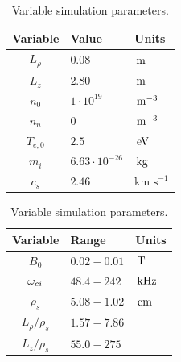 \begin{table}[h!]
    \begin{minipage}{.45\linewidth}
      \centering
            \begin{tabular}{c|ll}
            \hline\hline
            Variable & Value & Units\\
            \hline
            $L_\rho$  & $0.08$              & $\, \text{m}$              \\
            $L_z$     & $2.80$              & $\, \text{m}$              \\
            $n_0$     & $1\cdot 10^{19}$    & $\, \text{m}^{-3}$         \\
            $n_n$     & $0$                 & $\, \text{m}^{-3}$         \\
            $T_{e,0}$ & $2.5$               & $\, \text{eV}$             \\
            $m_i$     & $6.63\cdot10^{-26}$ & $\, \text{kg}$             \\
            $c_s$     & $2.46$              & $\text{km s}^{-1}$\\
            \hline\hline
            \end{tabular}
            \caption{Fixed simulation parameters.}
            \label{tb:input}
    \end{minipage}
    \hfill
    \begin{minipage}{.45\linewidth}
      \centering
            \begin{tabular}{c|ll}
            \hline\hline
            Variable & Range & Units\\
            \hline
            $B_0$           & $0.02 - 0.01$  & $\, \text{T} $ \\
            $\omega_{ci}$      & $48.4 - 242$   & $\, \text{kHz}$\\
            $\rho_s$        & $5.08 - 1.02$  & $\, \text{cm}$ \\
            $L_\rho/\rho_s$ & $1.57 - 7.86$  &       \\
            $L_z/\rho_s$    & $55.0 - 275$   &       \\
            \hline\hline
            \end{tabular}
            \caption{Variable simulation parameters.}
            \label{tb:inputVar}
    \end{minipage}
\end{table}
%

